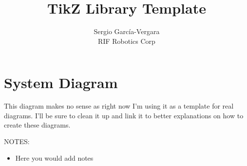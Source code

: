 \documentclass[11pt]{article}
\begin{document}

\title{TikZ Library Template}
\author{
  Sergio Garc\'{i}a-Vergara \\
  RIF Robotics Corp \\
}

\maketitle








\section{System Diagram}

This diagram makes no sense as right now I'm using it as a template for real
diagrams. I'll be sure to clean it up and link it to better explanations on how
to create these diagrams.

\vspace{1em}
\noindent NOTES:
\begin{itemize}
  \item Here you would add notes
\end{itemize}
\end{document}
